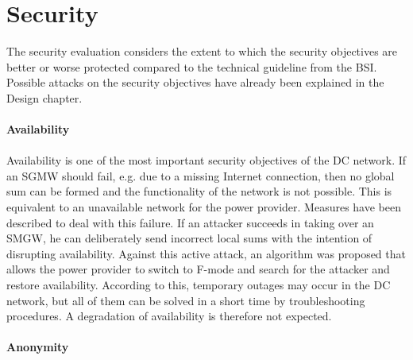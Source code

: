 \section{Security}
The security evaluation considers the extent to which the security objectives are better or worse protected compared to the technical guideline from the BSI. Possible attacks on the security objectives have already been explained in the Design chapter.
\\
\\
\textbf{Availability}
\\
\\
Availability is one of the most important security objectives of the DC network. If an SGMW should fail, e.g. due to a missing Internet connection, then no global sum can be formed and the functionality of the network is not possible. This is equivalent to an unavailable network for the power provider. Measures have been described to deal with this failure. If an attacker succeeds in taking over an SMGW, he can deliberately send incorrect local sums with the intention of disrupting availability. Against this active attack, an algorithm was proposed that allows the power provider to switch to F-mode and search for the attacker and restore availability. According to this, temporary outages may occur in the DC network, but all of them can be solved in a short time by troubleshooting procedures. A degradation of availability is therefore not expected.
\\
\\
\textbf{Anonymity}
\\
\\
